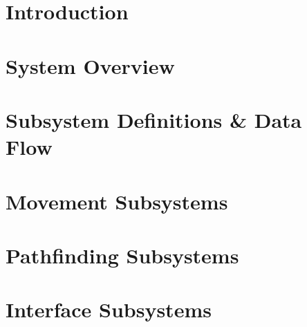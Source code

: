 \documentclass[11pt,letterpaper]{article}
\begin{document}
\section{Introduction}

\newpage
\section{System Overview}

\newpage
\section{Subsystem Definitions \& Data Flow}

\newpage
\section{Movement Subsystems}

\newpage
\section{Pathfinding Subsystems}

\newpage
\section{Interface Subsystems}

\newpage

%

{}
\end{document}
